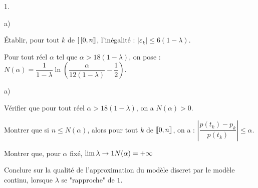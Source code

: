 \documentclass[11pt]{article}%
\begin{document}
\begin{noliste}{1.}
\begin{noliste}{a)}
\item Établir, pour tout $k$ de $[ \
\hspace{-0.15em}[0,n]\hspace{-0.13em}]$,
l'inégalité : $|\varepsilon_{k}|\leq 6(1-\lambda )$.
\end{noliste}

\item Pour tout réel $\alpha $ tel que $\alpha >18(1-\lambda )$, on
pose : $N(\alpha ) = \dfrac{1}{1-\lambda }\ln \left( \dfrac{\alpha
}{12(1-\lambda )}-\dfrac{1}{2}\right) $.

\begin{noliste}{a)}
 \setlength{\itemsep}{2mm}
\item Vérifier que pour tout réel $\alpha> 18(1-\lambda)$, on a
$N(\alpha)>0$.

\item Montrer que si $n\leq N(\alpha )$, alors pour tout $k$ de
$[\hspace{-0.15em}[0,n]\hspace{-0.13em}]$, on a : $\left|
\dfrac{p(t_{k})-p_{k}}{p(t_{k})}\right| \leq \alpha $.

\item Montrer que, pour $\alpha $ fixé, $\lim{\lambda \rightarrow
1}N(\alpha ) = + \infty $

\item Conclure sur la qualité de l'approximation du modèle discret par
le modèle continu, lorsque $\lambda$ se "rapproche" de $1$.
\end{noliste}
\end{noliste}

\label{fin}
\end{document}
